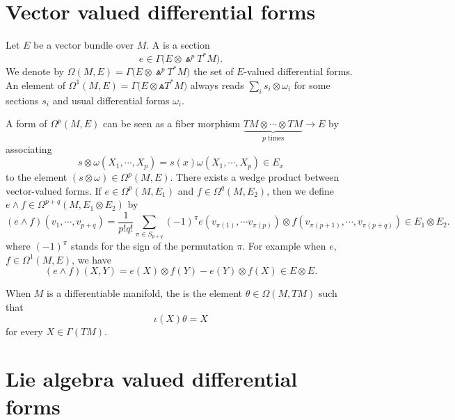 \section{Vector valued differential forms}	\label{SecVectValFiffFor}

Let $E$ be a vector bundle over $M$. A  is a section
\[ 
  e\in\Gamma\big( E\otimes\Wedge^pT^*M \big).
\]
We denote by $\Omega(M,E)=\Gamma\big( E\otimes\Wedge^pT^*M \big)$ the set of $E$-valued differential forms. An element of $\Omega^1(M,E)=\Gamma\big( E\otimes\Wedge T^*M\big)$ always reads  $\sum_is_i\otimes\omega_i$ for some sections $s_i$ and usual differential forms $\omega_i$.

A form of $\Omega^p(M,E)$ can be seen as a fiber morphism $\underbrace{TM\otimes\cdots\otimes TM}_{\text{$p$ times}}\to E$ by associating 
\[ 
  s\otimes\omega(X_1,\cdots,X_p)=s(x)\omega(X_1,\cdots,X_p)\in E_x
\]
to the element $(s\otimes \omega)\in\Omega^p(M,E)$. There exists a wedge product between vector-valued forms. If $e\in\Omega^p(M,E_1)$ and $f\in\Omega^q(M,E_2)$, then we define $e\wedge f\in\Omega^{p+q}(M,E_1\otimes E_2)$ by
\begin{equation}	\label{EqDefwedgevecor}
(e\wedge f)(v_1,\cdots,v_{p+q})=\frac{1}{ p!q! }\sum_{\pi\in S_{p+q}}(-1)^{\pi} e(v_{\pi(1)},\cdots v_{\pi(p)})\otimes f(v_{\pi(p+1)},\cdots,v_{\pi(p+q)})\in E_1\otimes E_2.
\end{equation}
where $(-1)^{\pi}$ stands for the sign of the permutation $\pi$. For example when $e$, $f\in \Omega^1(M,E)$, we have
\[ 
  (e\wedge f)(X,Y)=e(X)\otimes f(Y)-e(Y)\otimes f(X)\in E\otimes E.
\]

When $M$ is a differentiable manifold, the  is the element $\theta\in\Omega(M,TM)$ such that
\[ 
  \iota(X)\theta=X
\]
for every $X\in \Gamma(TM)$. 

\section{Lie algebra valued differential forms}	\label{SecLiaAlgformval}

